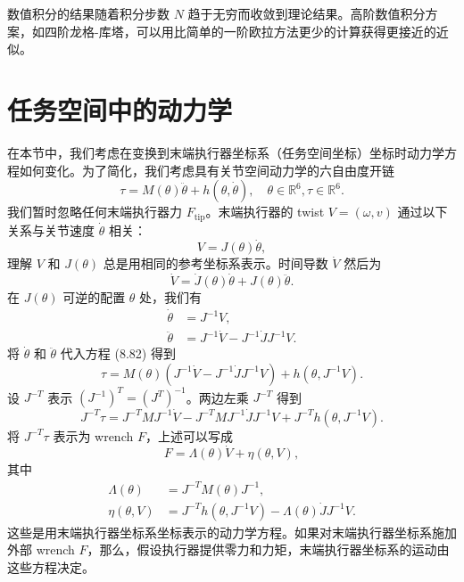 \documentclass[12pt,a4paper]{article}
\begin{document}
数值积分的结果随着积分步数 $N$ 趋于无穷而收敛到理论结果。高阶数值积分方案，如四阶龙格-库塔，可以用比简单的一阶欧拉方法更少的计算获得更接近的近似。

\section{任务空间中的动力学}
在本节中，我们考虑在变换到末端执行器坐标系（任务空间坐标）坐标时动力学方程如何变化。为了简化，我们考虑具有关节空间动力学的六自由度开链
\begin{equation}
\tau = M(\theta)\ddot{\theta} + h(\theta, \dot{\theta}), \quad \theta \in \mathbb{R}^6, \tau \in \mathbb{R}^6. \label{eq:8.82}
\end{equation}
我们暂时忽略任何末端执行器力 $F_{\text{tip}}$。末端执行器的 twist $V = (\omega, v)$ 通过以下关系与关节速度 $\dot{\theta}$ 相关：
\begin{equation}
V = J(\theta)\dot{\theta}, \label{eq:8.83}
\end{equation}
理解 $V$ 和 $J(\theta)$ 总是用相同的参考坐标系表示。时间导数 $\dot{V}$ 然后为
\begin{equation}
\dot{V} = \dot{J}(\theta)\dot{\theta} + J(\theta)\ddot{\theta}. \label{eq:8.84}
\end{equation}
在 $J(\theta)$ 可逆的配置 $\theta$ 处，我们有
\begin{align}
\dot{\theta} &= J^{-1}V, \label{eq:8.85} \\
\ddot{\theta} &= J^{-1}\dot{V} - J^{-1}\dot{J}J^{-1}V. \label{eq:8.86}
\end{align}
将 $\dot{\theta}$ 和 $\ddot{\theta}$ 代入方程 (8.82) 得到
\begin{equation}
\tau = M(\theta)\left(J^{-1}\dot{V} - J^{-1}\dot{J}J^{-1}V\right) + h(\theta, J^{-1}V). \label{eq:8.87}
\end{equation}
设 $J^{-T}$ 表示 $(J^{-1})^T = (J^T)^{-1}$。两边左乘 $J^{-T}$ 得到
\begin{equation}
J^{-T}\tau = J^{-T}MJ^{-1}\dot{V} - J^{-T}MJ^{-1}\dot{J}J^{-1}V + J^{-T}h(\theta, J^{-1}V). \label{eq:8.88}
\end{equation}
将 $J^{-T}\tau$ 表示为 wrench $F$，上述可以写成
\begin{equation}
F = \Lambda(\theta)\dot{V} + \eta(\theta, V), \label{eq:8.89}
\end{equation}
其中
\begin{align}
\Lambda(\theta) &= J^{-T}M(\theta)J^{-1}, \label{eq:8.90} \\
\eta(\theta, V) &= J^{-T}h(\theta, J^{-1}V) - \Lambda(\theta)\dot{J}J^{-1}V. \label{eq:8.91}
\end{align}
这些是用末端执行器坐标系坐标表示的动力学方程。如果对末端执行器坐标系施加外部 wrench $F$，那么，假设执行器提供零力和力矩，末端执行器坐标系的运动由这些方程决定。
\end{document}

